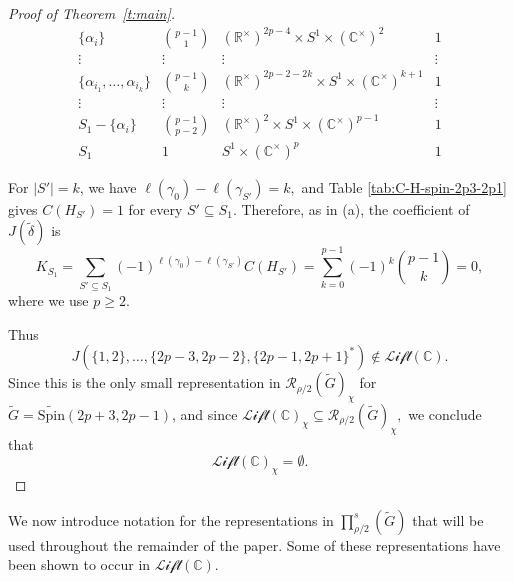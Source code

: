 \documentclass{amsart}
\newcommand{\LLift}{\mathscr{Lift}}
\newcommand{\bbC}{{\mathbb{C}}}
\newcommand{\bbR}{{\mathbb R}}
\newcommand{\Spin}{{\mathrm{Spin}}}
\theoremstyle{definition}
\newcommand{\tu}{\widetilde}
\begin{document}
\begin{proof}[Proof of Theorem~\ref{t:main}]
\begin{table}[!htbp]
\[\begin{array}{c|c|c|c}
\{\alpha_i\}
&
{p-1\choose 1}
&
(\bbR^\times)^{2p-4}\times S^1\times(\bbC^\times)^2
&
1
\\

\vdots
&
\vdots
&
\vdots
&
\vdots
\\

\{\alpha_{i_1},\ldots,\alpha_{i_k}\}
&
{p-1\choose k}
&
(\bbR^\times)^{2p-2-2k}\times S^1\times(\bbC^\times)^{k+1}
&
1
\\

\vdots
&
\vdots
&
\vdots
&
\vdots
\\

S_1-\{\alpha_i\}
&
{p-1\choose p-2}
&
(\bbR^\times)^2\times S^1\times(\bbC^\times)^{p-1}
&
1
\\

S_1
&
1
&
S^1\times(\bbC^\times)^p
&
1
\end{array}
\]
\caption{The Cartan subgroups \(H_{S'}\) and lifting constants \(C(H_{S'})\) for \(S'\subseteq S_1\) in the case \(G=\Spin(2p+3,2p-1)\).}
\label{tab:C-H-spin-2p3-2p1}
\end{table}

For \(|S'|=k\), we have 
$\ell(\gamma_0)-\ell(\gamma_{S'})=k,$
and Table \ref{tab:C-H-spin-2p3-2p1} gives
$C(H_{S'})=1$ for every $S'\subseteq S_1$. Therefore, as in (a), the coefficient of
\(J(\tu\delta)\) is
\[
K_{S_1}
=
\sum_{S'\subseteq S_1}
(-1)^{\ell(\gamma_0)-\ell(\gamma_{S'})}
C(H_{S'})
=
\sum_{k=0}^{p-1}
(-1)^k {p-1\choose k}
=
0,
\]
where we use \(p\geq 2\).

Thus
\[
J(\{1,2\},\ldots,\{2p-3,2p-2\},\{2p-1,2p+1\}^*)
\notin \LLift(\bbC).
\]
Since this is the only small representation in
$\mathcal R_{\rho/2}(\tu G)_\chi$
for \(\tu G=\tu{\Spin}(2p+3,2p-1)\), and since $\LLift(\bbC)_\chi\subseteq \mathcal R_{\rho/2}(\tu G)_\chi,$
we conclude that
\[
\LLift(\bbC)_\chi=\emptyset.
\]
\end{proof}

We now introduce notation for the representations in
$\prod_{\rho/2}^s(\tu G)$ that will be used throughout the remainder of the paper. Some of these representations have been shown to occur in $\LLift(\bbC)$.
\end{document}
